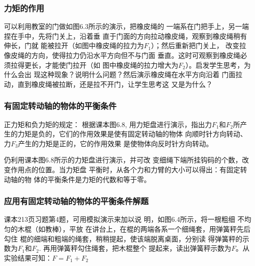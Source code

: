 \begin{figure}[htp]
    \centering
    \caption{}
\end{figure}

\subsubsection{力矩的作用}

\begin{figure}[htp]
    \centering
    \caption{}
\end{figure}

可以利用教室的门做如图6.3所示的演示，把橡皮绳的
一端系在门把手上，另一端捏在手中，先将门关上，沿着垂
直于门面的方向拉动橡皮绳，观察到橡皮绳稍有伸长，门就
能被拉开（如图中橡皮绳的拉力为$F_1$）；然后重新把门关上，
改变拉像皮绳的方向，使得拉力仍沿水平方向但不与门面
垂直。这时可观察到橡皮绳必须拉得更长，才能使门拉开（如
图中橡皮绳的拉力增大为$F_2$）。启发学生思考，为什么会出
现这种现象？说明什么问题？然后演示橡皮绳在水平方向沿着
门面拉动，直到橡皮绳被拉断，还是拉不开门，让学生思考这
又是为什么？

\subsubsection{有固定转动轴的物体的平衡条件}
正力矩和负力矩的规定：
根据课本图6.8, 用力矩盘进行演示，指出力$F_1$和$F_2$所产
生的力矩是负的，它们的作用效果是使有固定转动轴的物体
向顺时针方向转动、力$F_3$产生的力矩是正的，它的作用效果
是使物体向反时针方向转动。

仍利用课本图6.8所示的力矩盘进行演示，并可改
变细绳下端所挂钩码的个数，改变作用点的位置。当力矩盘
平衡时，从各个力和力臂的大小可以得出：有固定转动轴的物
体的平衡条件是力矩的代数和等于零。

\subsubsection{应用有固定转动轴的物体的平衡条件解题}
课本213页习题第4题，可用模拟演示来加以说
明，如图6.4所示，将一根粗细
不均匀的木棍（如教棒），平放
在讲台上，在棍的两端各系一个细绳套，用弹簧秤先后勾住
棍的细端和粗端的绳套，稍稍提起，使该端脱离桌面，分别读
得弹簧秤的示数为$F_1$和$F_2$. 再用弹簧秤勾住绳套，把木棍整个
提起来，读出弹簧秤示数为$F$。从实验结果可知：$F=F_1+F_2$


\begin{figure}[htp]
    \centering
    \caption{}
\end{figure}

